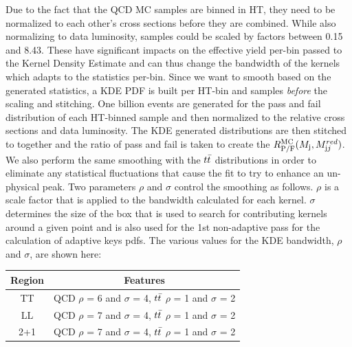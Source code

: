 \clearpage
Due to the fact that the QCD MC samples are binned in HT, they need to be normalized to each other's cross sections before they are combined. While also normalizing to data luminosity, samples could be scaled by factors between 0.15 and 8.43. These have significant impacts on the effective yield per-bin passed to the Kernel Density Estimate and can thus change the bandwidth of the kernels which adapts to the statistics per-bin. Since we want to smooth based on the generated statistics, a KDE PDF is built per HT-bin and samples \textit{before} the scaling and stitching. One billion events are generated for the pass and fail distribution of each HT-binned sample and then normalized to the relative cross sections and data luminosity. The KDE generated distributions are then stitched to together and the ratio of pass and fail is taken to create the $R^\mathrm{MC}_\mathrm{P/F}(M_{\textrm j},M_{\textrm jj}^{red})$. We also perform the same smoothing with the $t\bar{t} $ distributions in order to eliminate any statistical fluctuations that cause the fit to try to enhance an un-physical peak.  
Two parameters $\rho$ and $\sigma$ control the smoothing as follows. $\rho$ is a scale factor that is applied to the bandwidth calculated for each kernel. $\sigma$ determines the size of the box that is used to search for contributing kernels around a given point and is also used for the 1st non-adaptive pass for the calculation of adaptive keys pdfs. The various values for the KDE bandwidth, $\rho$ and $\sigma$, are shown here:
\begin{center}
\begin{tabular}{ |c|c| } 
 \hline
 Region & Features  \\ 
 \hline
 TT & QCD $\rho$ = 6 and $\sigma$ = 4, $t\bar{t} $ $\rho$ = 1 and $\sigma$ = 2\\ 
 LL & QCD $\rho$ = 7 and $\sigma$ = 4, $t\bar{t} $ $\rho$ = 1 and $\sigma$ = 2\\ 
 2+1 & QCD $\rho$ = 7 and $\sigma$ = 4, $t\bar{t} $ $\rho$ = 1  and $\sigma$ = 2\\   
 \hline
\end{tabular}
\end{center}
